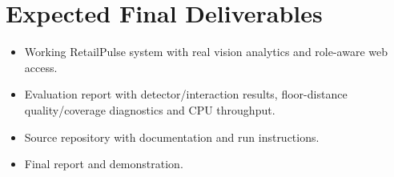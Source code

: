\section{Expected Final Deliverables}
\begin{itemize}
\item Working RetailPulse system with real vision analytics and role-aware web access.
\item Evaluation report with detector/interaction results, floor-distance quality/coverage diagnostics and CPU throughput.
\item Source repository with documentation and run instructions.
\item Final report and demonstration.
\end{itemize}
